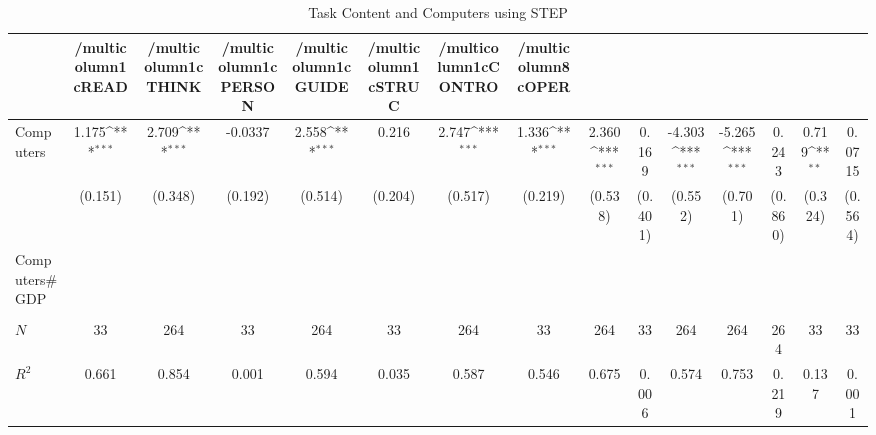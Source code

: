 \begin{table}[htbp]\centering
\def\sym#1{\ifmmode^{#1}\else\(^{#1}\)\fi}
\caption{Task Content and Computers using STEP}
\begin{tabular}{l*{14}{c}}
\hline\hline
            &/multicolumn{1}{c}{READ}&/multicolumn{1}{c}{THINK}&/multicolumn{1}{c}{PERSON}&/multicolumn{1}{c}{GUIDE}&/multicolumn{1}{c}{STRUC}&/multicolumn{1}{c}{CONTRO}&/multicolumn{8}{c}{OPER}                                                                                                                                                       \\
\hline
Computers   &       1.175\sym{***}&       2.709\sym{***}&     -0.0337         &       2.558\sym{***}&       0.216         &       2.747\sym{***}&       1.336\sym{***}&       2.360\sym{***}&       0.169         &      -4.303\sym{***}&      -5.265\sym{***}&       0.243         &       0.719\sym{**} &      0.0715         \\
            &     (0.151)         &     (0.348)         &     (0.192)         &     (0.514)         &     (0.204)         &     (0.517)         &     (0.219)         &     (0.538)         &     (0.401)         &     (0.552)         &     (0.701)         &     (0.860)         &     (0.324)         &     (0.564)         \\
[1em]
Computers#GDP&                     &                     &                     &                     &                     &                     &                     &                     &                     &                     &                     &                     &                     &                     \\
            &                     &                     &                     &                     &                     &                     &                     &                     &                     &                     &                     &                     &                     &                     \\
\hline
\(N\)       &          33         &         264         &          33         &         264         &          33         &         264         &          33         &         264         &          33         &         264         &         264         &         264         &          33         &          33         \\
\(R^{2}\)   &       0.661         &       0.854         &       0.001         &       0.594         &       0.035         &       0.587         &       0.546         &       0.675         &       0.006         &       0.574         &       0.753         &       0.219         &       0.137         &       0.001         \\
\hline\hline
\end{tabular}
\end{table}

